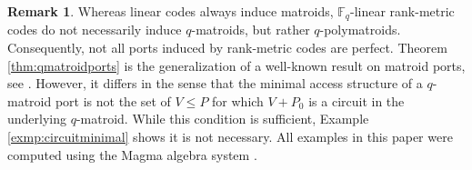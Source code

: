 \documentclass[onecolumn,draftclsnofoot,12pt]{IEEEtran}
\theoremstyle{plain} %
\theoremstyle{definition}
\newtheorem{remark}[theorem]{Remark}
\begin{document}
\begin{remark}
Whereas linear codes always induce matroids, ${\mathbb F}_q$-linear rank-metric codes do not necessarily induce $q$-matroids, but rather $q$-polymatroids. Consequently, not all ports induced by rank-metric codes are perfect. Theorem \ref{thm:qmatroidports} is the generalization of a well-known result on matroid ports, see \cite{farre_padro2007}. However, it differs in the sense that the minimal access structure of a $q$-matroid port is not the set of $V\leq P$ for which $V+P_0$ is a circuit in the underlying $q$-matroid. While this condition is sufficient, Example \ref{exmp:circuitminimal} shows it is not necessary. All examples in this paper were computed using the Magma algebra system \cite{MR1484478}. \label{remark1}
\end{remark}
\end{document}
